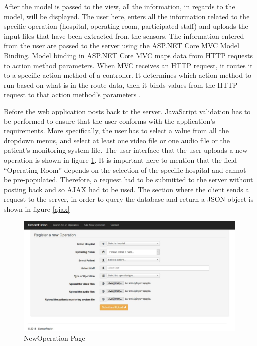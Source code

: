 After the model is passed to the view, all the information, in regards to the model, will be displayed. The user here, enters all the information related to the specific operation (hospital, operating room, participated staff) and uploads the input files that have been extracted from the sensors. The information entered from the user are passed to the server using the ASP.NET Core MVC Model Binding. Model binding in ASP.NET Core MVC maps data from HTTP requests to action method parameters. When MVC receives an HTTP request, it routes it to a specific action method of a controller. It determines which action method to run based on what is in the route data, then it binds values from the HTTP request to that action method's parameters \cite{modelBinding}.

Before the web application posts back to the server, JavaScript validation has to be performed to ensure that the user conforms with the application's requirements. More specifically, the user has to select a value from all the dropdown menus, and select at least one video file or one audio file or the patient's monitoring system file. The user interface that the user uploads a new operation is shown in figure \ref{new_operation_page}. It is important here to mention that the field ``Operating Room'' depends on the selection of the specific hospital and cannot be pre-populated. Therefore, a request had to be submitted to the server without posting back and so AJAX had to be used. The section where the client sends a request to the server, in order to query the database and return a JSON object is shown in figure \ref{ajax}


\begin{figure}[!ht]
\begin{center}
\includegraphics[width=17cm]{imgs/new_operation_page.jpg}
\end{center}\vspace{-0.3cm}
\caption[NewOperation Page]{NewOperation Page} \label{new_operation_page}
\end{figure}

